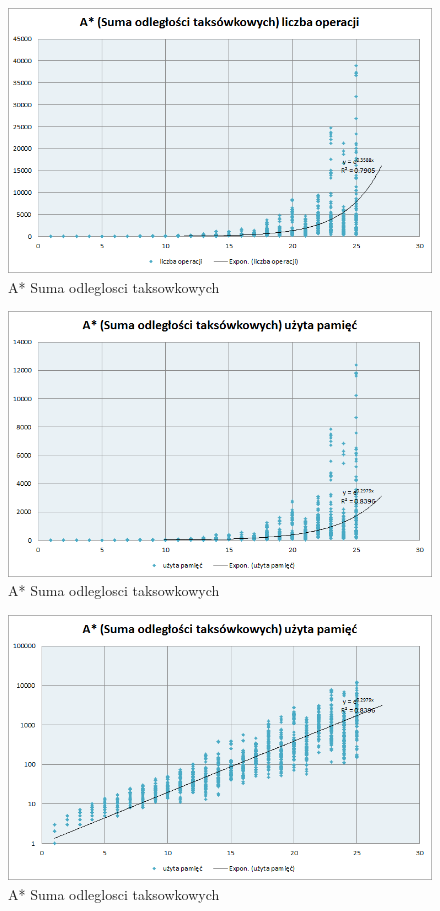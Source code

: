 \documentclass{classrep}
\begin{document}
\begin{figure}[ht]
\centering
			\includegraphics[scale=0.65]{pictures/A3_operacje_exp.png}
	\caption{A* Suma odleglosci taksowkowych}
	\label{fig:A* Suma odleglosci taksowkowych}
\end{figure}

\begin{figure}[ht]
\centering
			\includegraphics[scale=0.65]{pictures/A3_pamiec_exp.png}
	\caption{A* Suma odleglosci taksowkowych}
	\label{fig:A* Suma odleglosci taksowkowych}
\end{figure}

\begin{figure}[ht]
\centering
			\includegraphics[scale=0.65]{pictures/A3_pamiec_log.png}
	\caption{A* Suma odleglosci taksowkowych}
	\label{fig:A* Suma odleglosci taksowkowych}
\end{figure}
\end{document}
